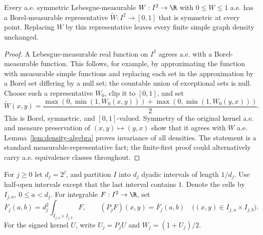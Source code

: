 \begin{lemma}
\label{lem:representative}
\proved Every a.e. symmetric Lebesgue-measurable $W:I^2\to\R$ with $0\le W\le1$ a.e. has
a Borel-measurable representative $\widetilde W:I^2\to[0,1]$ that is symmetric at every
point.  Replacing $W$ by this representative leaves every finite simple graph density
unchanged.
\end{lemma}
\begin{proof}
A Lebesgue-measurable real function on $I^2$ agrees a.e. with a Borel-measurable function.
This follows, for example, by approximating the function with measurable simple functions
and replacing each set in the approximation by a Borel set differing by a null set; the
countable union of exceptional sets is null.  Choose such a representative $W_0$, clip it
to $[0,1]$, and set
\[
 \widetilde W(x,y)=\frac{\max(0,\min(1,W_0(x,y)))+
                             \max(0,\min(1,W_0(y,x)))}2.
\]
This is Borel, symmetric, and $[0,1]$-valued.  Symmetry of the original kernel a.e. and
measure preservation of $(x,y)\mapsto(y,x)$ show that it agrees with $W$ a.e.
Lemma~\ref{lem:density-algebra} proves invariance of all densities.  The statement is a
standard measurable-representative fact; the finite-first proof could alternatively carry
a.e. equivalence classes throughout.
\end{proof}

\begin{definition}
\label{def:dyadic}
For $j\ge0$ let $d_j=2^j$, and partition $I$ into $d_j$ dyadic intervals of length $1/d_j$.
Use half-open intervals except that the last interval contains $1$.  Denote the cells by
$I_{j,a}$, $0\le a<d_j$.  For integrable $F:I^2\to\R$, set
\[
 \overline F_j(a,b)=d_j^2\int_{I_{j,a}\times I_{j,b}}F,
 \qquad
 (P_jF)(x,y)=\overline F_j(a,b)
 \quad\bigl((x,y)\in I_{j,a}\times I_{j,b}\bigr).
\]
For the signed kernel $U$, write $U_j=P_jU$ and $W_j=(1+U_j)/2$.
\end{definition}

